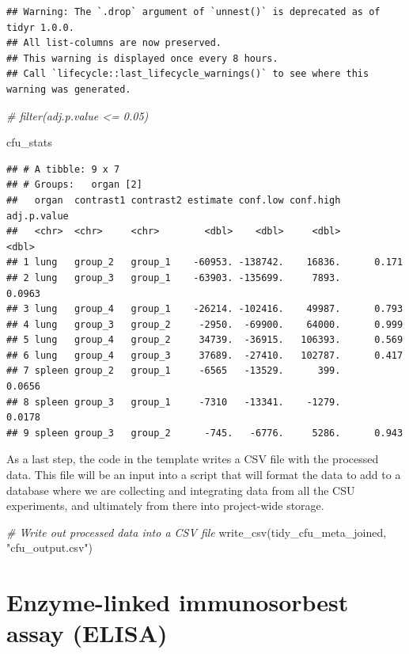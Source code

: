 \documentclass[
]{book}
\newenvironment{Shaded}{\begin{snugshade}}{\end{snugshade}}
\newcommand{\CommentTok}[1]{\textcolor[rgb]{0.56,0.35,0.01}{\textit{#1}}}
\newcommand{\FunctionTok}[1]{\textcolor[rgb]{0.00,0.00,0.00}{#1}}
\newcommand{\NormalTok}[1]{#1}
\newcommand{\StringTok}[1]{\textcolor[rgb]{0.31,0.60,0.02}{#1}}
\begin{document}
\begin{verbatim}
## Warning: The `.drop` argument of `unnest()` is deprecated as of tidyr 1.0.0.
## All list-columns are now preserved.
## This warning is displayed once every 8 hours.
## Call `lifecycle::last_lifecycle_warnings()` to see where this warning was generated.
\end{verbatim}

\begin{Shaded}
\begin{Highlighting}[]
  \CommentTok{\# filter(adj.p.value \textless{}= 0.05)}

\NormalTok{cfu\_stats}
\end{Highlighting}
\end{Shaded}

\begin{verbatim}
## # A tibble: 9 x 7
## # Groups:   organ [2]
##   organ  contrast1 contrast2 estimate conf.low conf.high adj.p.value
##   <chr>  <chr>     <chr>        <dbl>    <dbl>     <dbl>       <dbl>
## 1 lung   group_2   group_1    -60953. -138742.    16836.      0.171 
## 2 lung   group_3   group_1    -63903. -135699.     7893.      0.0963
## 3 lung   group_4   group_1    -26214. -102416.    49987.      0.793 
## 4 lung   group_3   group_2     -2950.  -69900.    64000.      0.999 
## 5 lung   group_4   group_2     34739.  -36915.   106393.      0.569 
## 6 lung   group_4   group_3     37689.  -27410.   102787.      0.417 
## 7 spleen group_2   group_1     -6565   -13529.      399.      0.0656
## 8 spleen group_3   group_1     -7310   -13341.    -1279.      0.0178
## 9 spleen group_3   group_2      -745.   -6776.     5286.      0.943
\end{verbatim}

As a last step, the code in the template writes a CSV file with the processed
data. This file will be an input into a script that will format the data to
add to a database where we are collecting and integrating data from all the CSU
experiments, and ultimately from there into project-wide storage.

\begin{Shaded}
\begin{Highlighting}[]
\CommentTok{\# Write out processed data into a CSV file}
\FunctionTok{write\_csv}\NormalTok{(tidy\_cfu\_meta\_joined, }\StringTok{"cfu\_output.csv"}\NormalTok{)}
\end{Highlighting}
\end{Shaded}

\hypertarget{enzyme-linked-immunosorbest-assay-elisa}{%
\chapter{Enzyme-linked immunosorbest assay (ELISA)}\label{enzyme-linked-immunosorbest-assay-elisa}}
\end{document}
